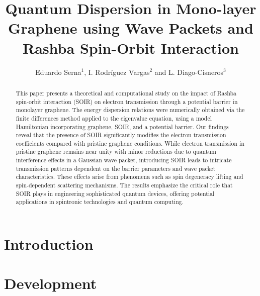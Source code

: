 \documentclass{../assets/templates/iopjournal}
\begin{document}
    \title{Quantum Dispersion in Mono-layer Graphene using Wave Packets and Rashba Spin-Orbit Interaction}
    \author{Eduardo Serna$^1$, I. Rodr\'iguez Vargas$^2$ and L. Diago-Cisneros$^3$}


    \begin{abstract}
        This paper presents a theoretical and computational study on the impact of Rashba spin-orbit interaction (SOIR) on electron transmission through a potential barrier in monolayer graphene.
        The energy dispersion relations were numerically obtained via the finite differences method applied to the eigenvalue equation, using a model Hamiltonian incorporating graphene, SOIR, and a potential barrier.
        Our findings reveal that the presence of SOIR significantly modifies the electron transmission coefficients compared with pristine graphene conditions.
        While electron transmission in pristine graphene remains near unity with minor reductions due to quantum interference effects in a Gaussian wave packet, introducing SOIR leads to intricate transmission patterns dependent on the barrier parameters and wave packet characteristics.
        These effects arise from phenomena such as spin degeneracy lifting and spin-dependent scattering mechanisms.
        The results emphasize the critical role that SOIR plays in engineering sophisticated quantum devices, offering potential applications in spintronic technologies and quantum computing.
    \end{abstract}





    \section{Introduction}\label{sec:introduction}
    



    \section{Development}\label{sec:development}
    
\end{document}
